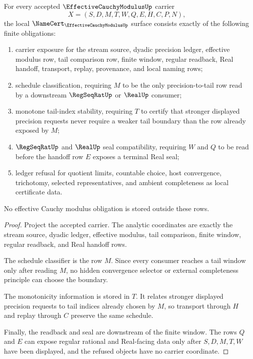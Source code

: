 \begin{theorem}
\label{thm:effective-cauchy-modulus-namecert-obligations}
For every accepted $\EffectiveCauchyModulusUp$ carrier
$$
X=(S,D,M,T,W,Q,E,H,C,P,N),
$$
the local $\NameCert_{\EffectiveCauchyModulusUp}$ surface consists exactly of the following finite obligations:
\begin{enumerate}
\item carrier exposure for the stream source, dyadic precision ledger, effective modulus row, tail comparison row, finite window, regular readback, Real handoff, transport, replay, provenance, and local naming rows;
\item schedule classification, requiring $M$ to be the only precision-to-tail row read by a downstream $\RegSeqRatUp$ or $\RealUp$ consumer;
\item monotone tail-index stability, requiring $T$ to certify that stronger displayed precision requests never require a weaker tail boundary than the row already exposed by $M$;
\item $\RegSeqRatUp$ and $\RealUp$ seal compatibility, requiring $W$ and $Q$ to be read before the handoff row $E$ exposes a terminal Real seal;
\item ledger refusal for quotient limits, countable choice, host convergence, trichotomy, selected representatives, and ambient completeness as local certificate data.
\end{enumerate}
No effective Cauchy modulus obligation is stored outside these rows.
\end{theorem}
\begin{proof}
Project the accepted carrier. The analytic coordinates are exactly the stream source, dyadic ledger, effective modulus, tail comparison, finite window, regular readback, and Real handoff rows.

The schedule classifier is the row $M$. Since every consumer reaches a tail window only after reading $M$, no hidden convergence selector or external completeness principle can choose the boundary.

The monotonicity information is stored in $T$. It relates stronger displayed precision requests to tail indices already chosen by $M$, so transport through $H$ and replay through $C$ preserve the same schedule.

Finally, the readback and seal are downstream of the finite window. The rows $Q$ and $E$ can expose regular rational and Real-facing data only after $S,D,M,T,W$ have been displayed, and the refused objects have no carrier coordinate.
\end{proof}

